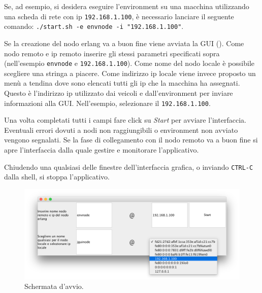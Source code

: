 \documentclass{memoir}
\begin{document}
Se, ad esempio, si desidera eseguire l'environment su una macchina utilizzando
una scheda di rete con ip \texttt{192.168.1.100}, è necessario lanciare il
seguente comando: \texttt{./start.sh -e envnode -i "192.168.1.100"}.

Se la creazione del nodo erlang va a buon fine viene avviata la GUI
(). Come nodo remoto e ip remoto inserire gli stessi
parametri specificati sopra (nell'esempio \texttt{envnode} e
\texttt{192.168.1.100}). Come nome del nodo locale è possibile scegliere una
stringa a piacere. Come indirizzo ip locale viene invece proposto un menù a
tendina dove sono elencati tutti gli ip che la macchina ha assegnati. Questo è
l'indirizzo ip utilizzato dai veicoli e dall'environment per inviare
informazioni alla GUI. Nell'esempio, selezionare il \texttt{192.168.1.100}.

Una volta completati tutti i campi fare click su \emph{Start} per avviare
l'interfaccia. Eventuali errori dovuti a nodi non raggiungibili o environment
non avviato vengono segnalati. Se la fase di collegamento con il nodo remoto va
a buon fine si apre l'interfaccia dalla quale gestire e monitorare
l'applicativo.

Chiudendo una qualsiasi delle finestre dell'interfaccia grafica, o inviando
\texttt{CTRL-C} dalla shell, si stoppa l'applicativo.

\begin{figure}
\centering
\includegraphics[width=\textwidth]{guisetup}
\caption{Schermata d'avvio.}
\label{fig:gui-start}
\end{figure}
\end{document}
